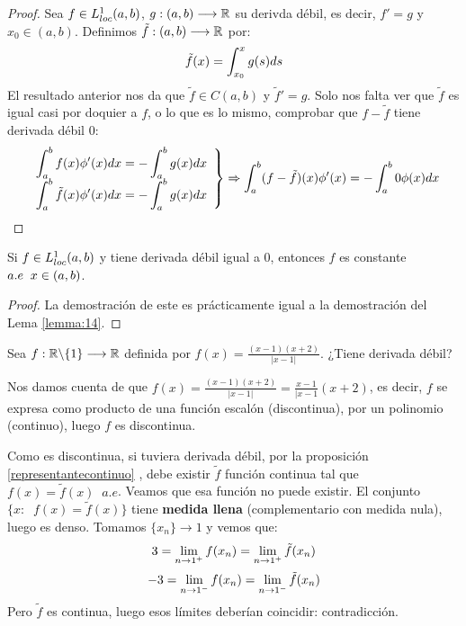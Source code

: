 \begin{proof}
Sea $f\in L^1_{loc}(a,b)$, $g : (a,b) \longrightarrow \mathbb{R}$ su derivda débil, es decir, $f'=g$ y $x_0\in(a,b)$. Definimos $\tilde{f} : (a,b) \longrightarrow \mathbb{R}$ por:
\[
\tilde{f}(x)=\displaystyle\int_{ x_0 }^{ x } g(s)ds
\]
El resultado anterior nos da que $\tilde{f}\in C(a,b)$ y $\tilde{f}'=g$. Solo nos falta ver que $\tilde{f}$ es igual casi por doquier a $f$, o lo que es lo mismo, comprobar que $f-\tilde{f}$ tiene derivada débil 0:
\[
\left.
\begin{array}{cc}
\displaystyle\int_{ a }^{ b } f(x)\phi'(x)dx=-\displaystyle\int_{ a }^{ b } g(x)dx \\
\displaystyle\int_{ a }^{ b } \tilde{f}(x)\phi'(x)dx=-\displaystyle\int_{ a }^{ b } g(x)dx
\end{array}
\right\} \Rightarrow \displaystyle\int_{ a }^{ b } (f-\tilde{f})(x)\phi'(x)=-\displaystyle\int_{ a }^{ b } 0\phi(x)dx
\]
\end{proof}

\begin{prop}
\label{derivadadebilcero}
Si $f\in L^1_{loc}(a,b)$ y tiene derivada débil igual a 0, entonces $f$ es constante $a.e \;\; x\in(a,b)$.
\end{prop}

\begin{proof}
La demostración de este es prácticamente igual a la demostración del Lema \ref{lemma:14}.
\end{proof}

\begin{example}[examen 18/19]
Sea $f : \mathbb{R}\backslash\{1\} \longrightarrow \mathbb{R}$ definida por $f(x)=\frac{(x-1)(x+2)}{|x-1|}$. ¿Tiene derivada débil?

Nos damos cuenta de que $f(x)=\frac{(x-1)(x+2)}{|x-1|}=\frac{x-1}{|x-1}(x+2)$, es decir, $f$ se expresa como producto de una función escalón (discontinua), por un polinomio (continuo), luego $f$ es discontinua.

Como es discontinua, si tuviera derivada débil, por la proposición \ref{representantecontinuo} , debe existir $\tilde{f}$ función continua tal que $f(x)=\tilde{f}(x)\;\; a.e$. Veamos que esa función no puede existir. El conjunto $\{x:\;\; f(x)=\tilde{f}(x)\}$ tiene \textbf{medida llena} (complementario con medida nula), luego es denso. Tomamos $\{x_n\}\longrightarrow 1$ y vemos que:
\[
3=\displaystyle\lim_{ n \to 1^+ } f(x_n)=\displaystyle\lim_{ n \to 1^+ } \tilde{f}(x_n)
\]
\[
-3=\displaystyle\lim_{ n \to 1^- } f(x_n)=\displaystyle\lim_{ n \to 1^- } \tilde{f}(x_n)
\]
Pero $\tilde{f}$ es continua, luego esos límites deberían coincidir: contradicción.

\end{example}

